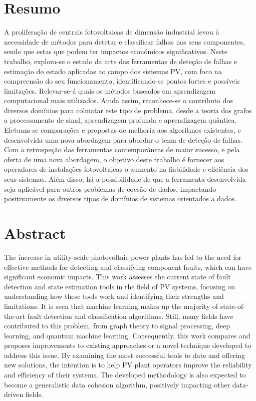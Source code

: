 \chapter*{Resumo}

A proliferação de centrais fotovoltaicas de dimensão industrial levou à necessidade de métodos para detetar e classificar falhas nos seus componentes, sendo que estas que podem ter impactos económicos significativos. Neste trabalho, explora-se o estado da arte das ferramentas de deteção de falhas e estimação do estado aplicadas ao campo dos sistemas PV, com foco na compreensão do seu funcionamento, identificando-se pontos fortes e possíveis limitações. Relevar-se-á quais os métodos baseados em aprendizagem computacional mais utilizados. Ainda assim, reconhece-se o contributo dos diversos domínios para colmatar este tipo de problema, desde a teoria dos grafos a processamento de sinal, aprendizagem profunda e aprendizagem quântica. Efetuam-se comparações e propostas de melhoria aos algoritmos existentes, e desenvolvida uma nova abordagem para abordar o tema de deteção de falhas. Com a retrospeção das ferramentas contemporâneas de maior sucesso, e pela oferta de uma nova abordagem, o objetivo deste trabalho é fornecer aos operadores de instalações fotovoltaicas o aumento na fiabilidade e eficiência dos seus sistemas. Além disso, há a possibilidade de que a ferramenta desenvolvida seja aplicável para outros problemas de coesão de dados, impactando positivamente os diversos tipos de domínios de sistemas orientados a dados.


\chapter*{Abstract}

The increase in utility-scale photovoltaic power plants has led to the need for effective methods for detecting and classifying component faults, which can have significant economic impacts. This work assesses the current state of fault detection and state estimation tools in the field of PV systems, focusing on understanding how these tools work and identifying their strengths and limitations. It is seen that machine learning makes up the majority of state-of-the-art fault detection and classification algorithms. Still, many fields have contributed to this problem, from graph theory to signal processing, deep learning, and quantum machine learning. Consequently, this work compares and proposes improvements to existing approaches or a novel technique developed to address this issue. By examining the most successful tools to date and offering new solutions, the intention is to help PV plant operators improve the reliability and efficiency of their systems. The developed methodology is also expected to become a generalistic data cohesion algorithm, positively impacting other data-driven fields.